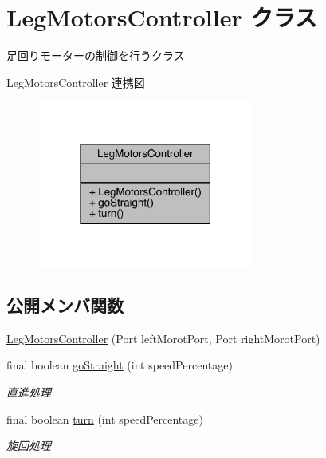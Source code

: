 \hypertarget{class_leg_motors_controller}{}\section{Leg\+Motors\+Controller クラス}
\label{class_leg_motors_controller}


足回りモーターの制御を行うクラス  




Leg\+Motors\+Controller 連携図
\nopagebreak
\begin{figure}[H]
\begin{center}
\leavevmode
\includegraphics[width=202pt]{d4/d01/class_leg_motors_controller__coll__graph}
\end{center}
\end{figure}
\subsection*{公開メンバ関数}
\begin{DoxyCompactItemize}
\item 
\mbox{\hyperlink{class_leg_motors_controller_afb404bdad1a5ce5d9f71b73ade3ccbb5}{Leg\+Motors\+Controller}} (Port left\+Morot\+Port, Port right\+Morot\+Port)
\item 
final boolean \mbox{\hyperlink{class_leg_motors_controller_ad5a3db7ac941bb2e66d3efb5e3214a54}{go\+Straight}} (int speed\+Percentage)
\begin{DoxyCompactList}\small\item\em 直進処理 \end{DoxyCompactList}\item 
final boolean \mbox{\hyperlink{class_leg_motors_controller_a0df4b63d6a21857d8b5fbff3875ff962}{turn}} (int speed\+Percentage)
\begin{DoxyCompactList}\small\item\em 旋回処理 \end{DoxyCompactList}\end{DoxyCompactItemize}


